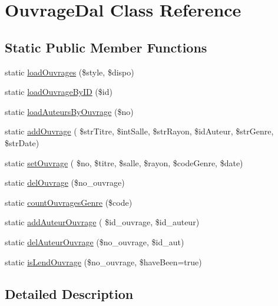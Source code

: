 \hypertarget{class_ouvrage_dal}{}\section{Ouvrage\+Dal Class Reference}
\label{class_ouvrage_dal}
\subsection*{Static Public Member Functions}
\begin{DoxyCompactItemize}
\item 
static \hyperlink{class_ouvrage_dal_a258aeb530dc933fded659e205fe695cb}{load\+Ouvrages} (\$style, \$dispo)
\item 
static \hyperlink{class_ouvrage_dal_ae04ea46ca41be614bea7c3e3a205c2d5}{load\+Ouvrage\+By\+ID} (\$id)
\item 
static \hyperlink{class_ouvrage_dal_a8751781cc892c3fb9b3fc01b2217be32}{load\+Auteurs\+By\+Ouvrage} (\$no)
\item 
static \hyperlink{class_ouvrage_dal_a74a8a40494b61585e1ac31efff58d42c}{add\+Ouvrage} ( \$str\+Titre, \$int\+Salle, \$str\+Rayon, \$id\+Auteur, \$str\+Genre, \$str\+Date)
\item 
static \hyperlink{class_ouvrage_dal_ab5d769ceb2eee46b1e1019b4d8fbe593}{set\+Ouvrage} ( \$no, \$titre, \$salle, \$rayon, \$code\+Genre, \$date)
\item 
static \hyperlink{class_ouvrage_dal_ab5fb4f596d9ce723bf6434f44c35abe6}{del\+Ouvrage} (\$no\+\_\+ouvrage)
\item 
static \hyperlink{class_ouvrage_dal_aa1c5c4d06963df032b7cf34d9b56c02e}{count\+Ouvrages\+Genre} (\$code)
\item 
static \hyperlink{class_ouvrage_dal_ac167255ec7d5c401529c374cbae5375f}{add\+Auteur\+Ouvrage} ( \$id\+\_\+ouvrage, \$id\+\_\+auteur)
\item 
static \hyperlink{class_ouvrage_dal_adcf7b6fc9ccb5eff881609181074acfe}{del\+Auteur\+Ouvrage} (\$no\+\_\+ouvrage, \$id\+\_\+aut)
\item 
static \hyperlink{class_ouvrage_dal_a06d77568506a618d1086c4412c265fa0}{is\+Lend\+Ouvrage} (\$no\+\_\+ouvrage, \$have\+Been=true)
\end{DoxyCompactItemize}


\subsection{Detailed Description}


